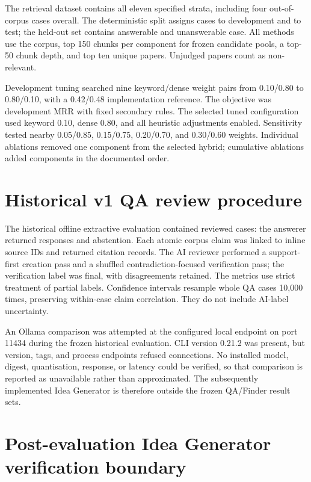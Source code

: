 The retrieval dataset contains all eleven specified strata, including four out-of-corpus cases overall. The deterministic split assigns \RetrievalDevCount{} cases to development and \RetrievalTestCount{} to test; the held-out set contains \RetrievalAnswerableTestCount{} answerable and \RetrievalUnanswerableTestCount{} unanswerable case. All methods use the \texttt{\CorpusSnapshotId} corpus, top 150 chunks per component for frozen candidate pools, a top-50 chunk depth, and top ten unique papers. Unjudged papers count as non-relevant.

Development tuning searched nine keyword/dense weight pairs from 0.10/0.80 to 0.80/0.10, with a 0.42/0.48 implementation reference. The objective was development MRR with fixed secondary rules. The selected tuned configuration used keyword 0.10, dense 0.80, and all heuristic adjustments enabled. Sensitivity tested nearby 0.05/0.85, 0.15/0.75, 0.20/0.70, and 0.30/0.60 weights. Individual ablations removed one component from the selected hybrid; cumulative ablations added components in the documented order.

\section{Historical v1 QA review procedure}

The historical offline extractive evaluation contained \QaCaseCount{} reviewed cases: the answerer returned \QaResponseCount{} responses and \QaAbstentionCount{} abstention. Each atomic corpus claim was linked to inline source IDs and returned citation records. The AI reviewer performed a support-first creation pass and a shuffled contradiction-focused verification pass; the verification label was final, with disagreements retained. The metrics use strict treatment of partial labels. Confidence intervals resample whole QA cases 10,000 times, preserving within-case claim correlation. They do not include AI-label uncertainty.

An Ollama comparison was attempted at the configured local endpoint on port 11434 during the frozen historical evaluation. CLI version 0.21.2 was present, but version, tags, and process endpoints refused connections. No installed model, digest, quantisation, response, or latency could be verified, so that comparison is reported as unavailable rather than approximated. The subsequently implemented Idea Generator is therefore outside the frozen QA/Finder result sets.

\section{Post-evaluation Idea Generator verification boundary}

